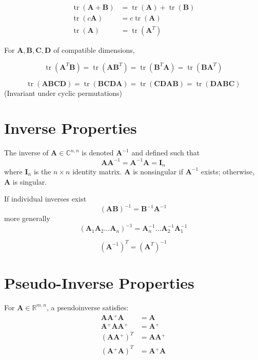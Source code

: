 \documentclass{book}
\newcommand{\mA}{\mathbf{A}}
\newcommand{\mB}{\mathbf{B}}
\newcommand{\mC}{\mathbf{C}}
\newcommand{\mD}{\mathbf{D}}
\newcommand{\mI}{\mathbf{I}}
\DeclareMathOperator{\trace}{tr}
\newcommand{\sCnn}{\mathbb{C}^{n,n}}
\newcommand{\sRmn}{\mathbb{R}^{m,n}}
\newcommand{\pinv}{\!^+}
\begin{document}
\begin{align}
\trace(\mA+\mB)&=\trace(\mA)+\trace(\mB) \\
\trace(c\mA)   &=c\trace(\mA)            \\
\trace(\mA)    &=\trace(\mA^T)
\end{align}

For $\mA,\mB,\mC,\mD$ of compatible dimensions,

\begin{equation}
\trace(\mA^T\mB)=\trace(\mA\mB^T)=\trace(\mB^T\mA)=\trace(\mB\mA^T)
\end{equation}

\begin{equation}
\trace(\mA\mB\mC\mD)=\trace(\mB\mC\mD\mA)=\trace(\mC\mD\mA\mB)=\trace(\mD\mA\mB\mC)
\end{equation}
(Invariant under cyclic permutations)



\chapter{Inverse Properties}
The inverse of $\mA\in\sCnn$ is denoted $\mA^{-1}$ and defined such that
\begin{equation}
\mA\mA^{-1}=\mA^{-1}\mA=\mI_n
\end{equation}
where $\mI_n$ is the $n \times n$ identity matrix. $\mA$ is nonsingular if $\mA^{-1}$ exists; otherwise, $\mA$ is singular.


If individual inverses exist
\begin{equation}
(\mA\mB)^{-1}=\mB^{-1}\mA^{-1}
\end{equation}
more generally
\begin{equation}
(\mA_1\mA_2\ldots\mA_n)^{-1}=\mA_n^{-1}\ldots\mA_2^{-1}\mA_1^{-1}
\end{equation}

\begin{equation}
(\mA^{-1})^T=(\mA^T)^{-1}
\end{equation}




\chapter{Pseudo-Inverse Properties}
For $\mA\in\sRmn$, a pseudoinverse satisfies:
\begin{align}
\mA\mA\pinv\mA      &= \mA         \\
\mA\pinv\mA\mA\pinv &= \mA\pinv    \\
(\mA\mA\pinv)^T     &= \mA\mA\pinv \\
(\mA\pinv\mA)^T     &= \mA\pinv\mA
\end{align}
\end{document}
